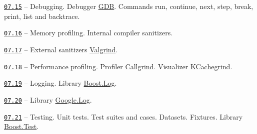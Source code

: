 \documentclass[a4paper,12pt]{article}
\renewenvironment{itemize}
{
    \begin{list}{\labelitemi}
    {
      \setlength{\topsep}{0pt}
      \setlength{\partopsep}{0pt}
      \setlength{\parskip}{0pt}
      \setlength{\itemsep}{0pt}
      \setlength{\parsep}{0pt}
      \setlength{\leftmargin}{14.5pt}
    }
}{\end{list}}
\begin{document}
\medskip\smallskip

\begin{itemize}

    \item \href{https://github.com/i-s-m-mipt/Education/blob/master/projects/examples/source/07.15.cpp}{\texttt{07.15}} -- Debugging. Debugger \href{https://sourceware.org/gdb/}{GDB}. Commands run, continue, next, step, break, print, list and backtrace.

    \smallskip

    \item \href{https://github.com/i-s-m-mipt/Education/blob/master/projects/examples/source/07.16.cpp}{\texttt{07.16}} -- Memory profiling. Internal compiler sanitizers.

    \smallskip

    \item \href{https://github.com/i-s-m-mipt/Education/blob/master/projects/examples/source/07.17.cpp}{\texttt{07.17}} -- External sanitizers \href{https://valgrind.org/}{Valgrind}.

    \smallskip

    \item \href{https://github.com/i-s-m-mipt/Education/blob/master/projects/examples/source/07.18.cpp}{\texttt{07.18}} --  Performance profiling. Profiler \href{https://valgrind.org/docs/manual/cl-manual.html}{Callgrind}. Visualizer \href{https://kcachegrind.sourceforge.net/html/Home.html}{KCachegrind}.

    \smallskip

    \item \href{https://github.com/i-s-m-mipt/Education/blob/master/projects/examples/source/07.19.cpp}{\texttt{07.19}} -- Logging. Library \href{https://www.boost.org/doc/libs/1_84_0/libs/log/doc/html/index.html}{Boost.Log}.

    \smallskip

    \item \href{https://github.com/i-s-m-mipt/Education/blob/master/projects/examples/source/07.20.cpp}{\texttt{07.20}} -- Library \href{https://github.com/google/glog}{Google.Log}.

    \smallskip

    \item \href{https://github.com/i-s-m-mipt/Education/blob/master/projects/examples/source/07.21.cpp}{\texttt{07.21}} -- Testing. Unit tests. Test suites and cases. Datasets. Fixtures. Library \href{https://www.boost.org/doc/libs/1_84_0/libs/test/doc/html/index.html}{Boost.Test}.


\end{itemize}
\end{document}
